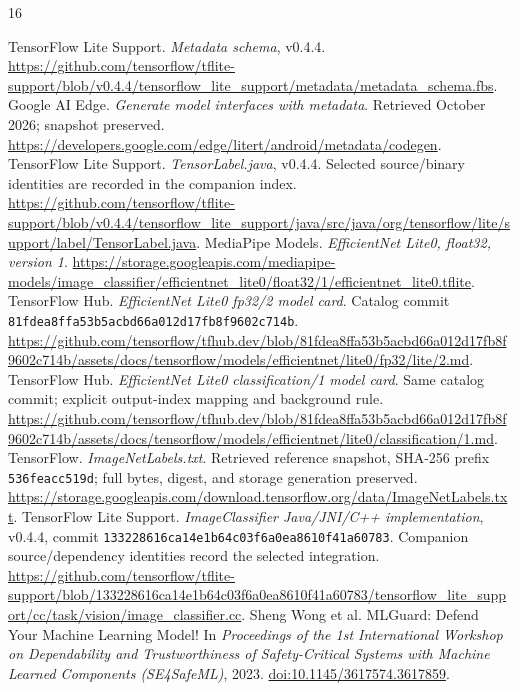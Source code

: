 \documentclass[10pt,conference]{IEEEtran}
\newcommand{\code}[1]{\texttt{#1}}
\begin{document}
\begin{thebibliography}{16}\small\raggedright
{} TensorFlow Lite Support. \emph{Metadata schema}, v0.4.4. \url{https://github.com/tensorflow/tflite-support/blob/v0.4.4/tensorflow_lite_support/metadata/metadata_schema.fbs}.
 Google AI Edge. \emph{Generate model interfaces with metadata}. Retrieved October 2026; snapshot preserved. \url{https://developers.google.com/edge/litert/android/metadata/codegen}.
 TensorFlow Lite Support. \emph{TensorLabel.java}, v0.4.4. Selected source/binary identities are recorded in the companion index. \url{https://github.com/tensorflow/tflite-support/blob/v0.4.4/tensorflow_lite_support/java/src/java/org/tensorflow/lite/support/label/TensorLabel.java}.
 MediaPipe Models. \emph{EfficientNet Lite0, float32, version 1}. \url{https://storage.googleapis.com/mediapipe-models/image_classifier/efficientnet_lite0/float32/1/efficientnet_lite0.tflite}.
 TensorFlow Hub. \emph{EfficientNet Lite0 fp32/2 model card}. Catalog commit \code{81fdea8ffa53b5acbd66a012d17fb8f9602c714b}. \url{https://github.com/tensorflow/tfhub.dev/blob/81fdea8ffa53b5acbd66a012d17fb8f9602c714b/assets/docs/tensorflow/models/efficientnet/lite0/fp32/lite/2.md}.
 TensorFlow Hub. \emph{EfficientNet Lite0 classification/1 model card}. Same catalog commit; explicit output-index mapping and background rule. \url{https://github.com/tensorflow/tfhub.dev/blob/81fdea8ffa53b5acbd66a012d17fb8f9602c714b/assets/docs/tensorflow/models/efficientnet/lite0/classification/1.md}.
 TensorFlow. \emph{ImageNetLabels.txt}. Retrieved reference snapshot, SHA-256 prefix \code{536feacc519d}; full bytes, digest, and storage generation preserved. \url{https://storage.googleapis.com/download.tensorflow.org/data/ImageNetLabels.txt}.
 TensorFlow Lite Support. \emph{ImageClassifier Java/JNI/C++ implementation}, v0.4.4, commit \code{133228616ca14e1b64c03f6a0ea8610f41a60783}. Companion source/dependency identities record the selected integration. \url{https://github.com/tensorflow/tflite-support/blob/133228616ca14e1b64c03f6a0ea8610f41a60783/tensorflow_lite_support/cc/task/vision/image_classifier.cc}.
 Sheng Wong et al. MLGuard: Defend Your Machine Learning Model! In \emph{Proceedings of the 1st International Workshop on Dependability and Trustworthiness of Safety-Critical Systems with Machine Learned Components (SE4SafeML)}, 2023. \href{https://doi.org/10.1145/3617574.3617859}{doi:10.1145/3617574.3617859}.


\end{thebibliography}
\end{document}
